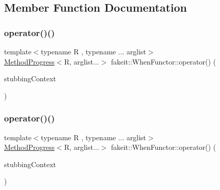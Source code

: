 \subsection{Member Function Documentation}
\mbox{\label{classfakeit_1_1WhenFunctor_ad93479462c8651e779ab83d2699d6a0c}} 
\subsubsection{\texorpdfstring{operator()()}{operator()()}\hspace{0.1cm}{\footnotesize\ttfamily [1/9]}}
{\footnotesize\ttfamily template$<$typename R , typename ... arglist$>$ \\
\mbox{\hyperlink{structfakeit_1_1WhenFunctor_1_1MethodProgress}{Method\+Progress}}$<$R, arglist...$>$ fakeit\+::\+When\+Functor\+::operator() (\begin{DoxyParamCaption}\item[{const \mbox{\hyperlink{structfakeit_1_1StubbingContext}{Stubbing\+Context}}$<$ R, arglist... $>$ \&}]{stubbing\+Context }\end{DoxyParamCaption})\hspace{0.3cm}{\ttfamily [inline]}}

\mbox{\label{classfakeit_1_1WhenFunctor_ad93479462c8651e779ab83d2699d6a0c}} 
\subsubsection{\texorpdfstring{operator()()}{operator()()}\hspace{0.1cm}{\footnotesize\ttfamily [2/9]}}
{\footnotesize\ttfamily template$<$typename R , typename ... arglist$>$ \\
\mbox{\hyperlink{structfakeit_1_1WhenFunctor_1_1MethodProgress}{Method\+Progress}}$<$R, arglist...$>$ fakeit\+::\+When\+Functor\+::operator() (\begin{DoxyParamCaption}\item[{const \mbox{\hyperlink{structfakeit_1_1StubbingContext}{Stubbing\+Context}}$<$ R, arglist... $>$ \&}]{stubbing\+Context }\end{DoxyParamCaption})\hspace{0.3cm}{\ttfamily [inline]}}

